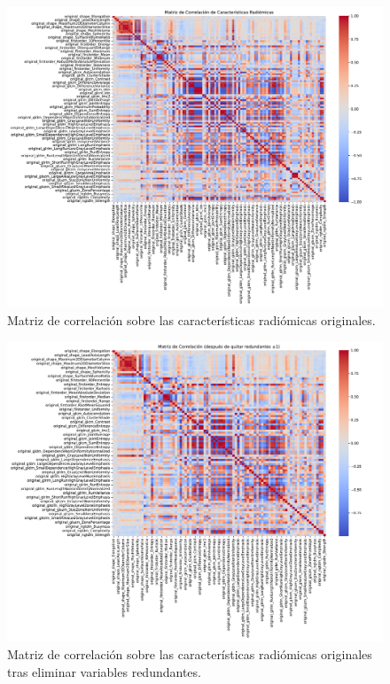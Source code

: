 \begin{figure}[!htbp]
\includegraphics[width=\textwidth]{img/corrplot_radiomics.pdf}
\caption{Matriz de correlación sobre las características radiómicas originales.}\label{fig:corr_radiomics}
\end{figure}

\begin{figure}[!htbp]
\includegraphics[width=\textwidth]{img/corrplot_radiomics_cleaned.pdf}
\caption{Matriz de correlación sobre las características radiómicas originales tras eliminar variables redundantes.}\label{fig:corr_after_remove}
\end{figure}

